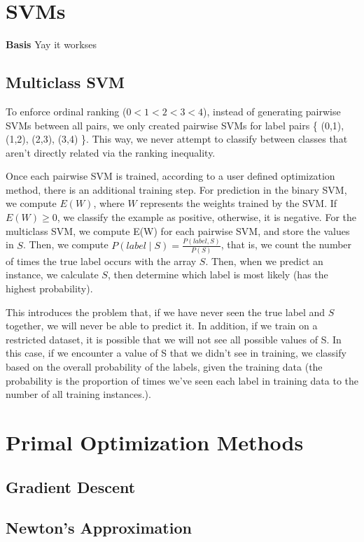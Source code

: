 \documentclass[letterpaper, 11pt]{article}
\begin{document}
\section{SVMs}

\textbf{Basis} Yay it workses

\subsection{Multiclass SVM}
To enforce ordinal ranking ($0 < 1 < 2 < 3 < 4$), instead of generating pairwise SVMs between all pairs, we only created pairwise SVMs for label pairs \{ (0,1), (1,2), (2,3), (3,4) \}.  This way, we never attempt to classify between classes that aren't directly related via the ranking inequality.

Once each pairwise SVM is trained, according to a user defined optimization method, there is an additional training step.  For prediction in the binary SVM, we compute $E(W)$, where $W$ represents the weights trained by the SVM.  If $E(W) \ge 0$, we classify the example as positive, otherwise, it is negative.  For the multiclass SVM, we compute E(W) for each pairwise SVM, and store the values in $S$.  Then, we compute $P(label \mid S) = \frac{P(label, S)}{P(S)}$, that is, we count the number of times the true label occurs with the array $S$.  Then, when we predict an instance, we calculate $S$, then determine which label is most likely (has the highest probability).

This introduces the problem that, if we have never seen the true label and $S$ together, we will never be able to predict it.  In addition, if we train on a restricted dataset, it is possible that we will not see all possible values of S.  In this case, if we encounter a value of S that we didn't see in training, we classify based on the overall probability of the labels, given the training data (the probability is the proportion of times we've seen each label in training data to the number of all training instances.).

\section{Primal Optimization Methods}

\subsection{Gradient Descent}

\subsection{Newton's Approximation}
\end{document}

